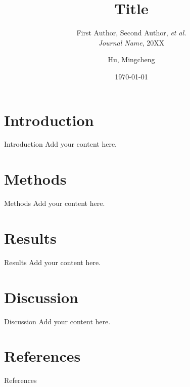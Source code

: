 \documentclass[aspectratio=169,t]{beamer}
\title{Title}
\subtitle{
First Author, Second Author, \textit{et al.} \\
\textit{Journal Name}, 20XX
}
\author{Hu, Mingcheng}
\institute{Department of Statistics \& Data Science}
\date{\today}
\providecommand\CUHKSourceDir{.}
\begin{document}
\maketitle

\section{Introduction}
\begin{frame}{Introduction}
Add your content here.
\end{frame}

\section{Methods}
\begin{frame}{Methods}
Add your content here.
\end{frame}

\section{Results}
\begin{frame}{Results}
Add your content here.
\end{frame}

\section{Discussion}
\begin{frame}{Discussion}
Add your content here.
\end{frame}

\section{References}
\begin{frame}[t,allowframebreaks]{References}
\end{frame}

\end{document}
